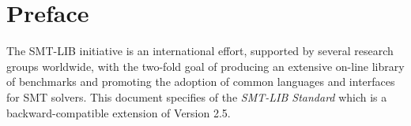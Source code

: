 

\chapter*{Preface}


The SMT-LIB initiative is an international effort, 
supported by several research groups worldwide, 
with the two-fold goal of producing an extensive on-line library of benchmarks and
promoting the adoption of common languages and interfaces for SMT solvers. 
This document specifies \thisversion of the \emph{SMT-LIB Standard}
which is a backward-compatible extension of Version 2.5.
\medskip

\thispagestyle{empty}
